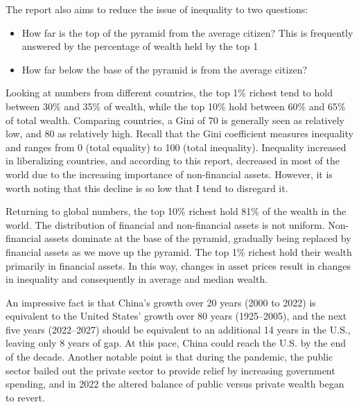 The report also aims to reduce the issue of inequality to two questions:
\begin{itemize}
\item    How far is the top of the pyramid from the average citizen? This is frequently answered by the percentage of wealth held by the top 1%
\item    How far below the base of the pyramid is from the average citizen?
\end{itemize}
Looking at numbers from different countries, the top 1\% richest tend to hold between 30\% and 35\% of wealth, while the top 10\% hold between 60\% and 65\% of total wealth. Comparing countries, a Gini of 70 is generally seen as relatively low, and 80 as relatively high. Recall that the Gini coefficient measures inequality and ranges from 0 (total equality) to 100 (total inequality). Inequality increased in liberalizing countries, and according to this report, decreased in most of the world due to the increasing importance of non-financial assets. However, it is worth noting that this decline is so low that I tend to disregard it.

Returning to global numbers, the top 10\% richest hold 81\% of the wealth in the world. The distribution of financial and non-financial assets is not uniform. Non-financial assets dominate at the base of the pyramid, gradually being replaced by financial assets as we move up the pyramid. The top 1\% richest hold their wealth primarily in financial assets. In this way, changes in asset prices result in changes in inequality and consequently in average and median wealth.

An impressive fact is that China's growth over 20 years (2000 to 2022) is equivalent to the United States’ growth over 80 years (1925–2005), and the next five years (2022–2027) should be equivalent to an additional 14 years in the U.S., leaving only 8 years of gap. At this pace, China could reach the U.S. by the end of the decade. Another notable point is that during the pandemic, the public sector bailed out the private sector to provide relief by increasing government spending, and in 2022 the altered balance of public versus private wealth began to revert.

